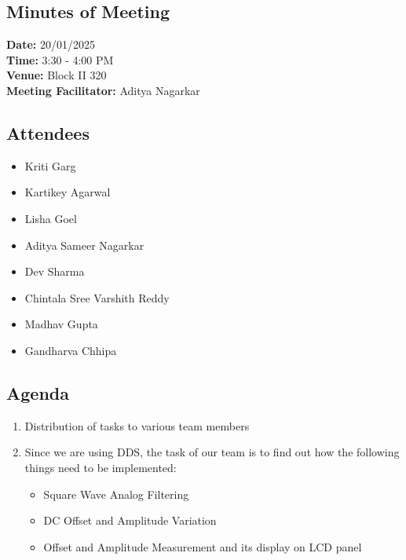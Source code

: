 \documentclass[12pt,a4paper]{article}
\begin{document}
\subsection*{Minutes of Meeting}


\noindent
\textbf{Date:} 20/01/2025 \\
\textbf{Time:} 3:30 - 4:00 PM \\
\textbf{Venue:} Block II 320 \\
\textbf{Meeting Facilitator:} Aditya Nagarkar \\
\vspace{0.3cm}


\subsection*{Attendees}
\begin{itemize}
    \item Kriti Garg
    \item Kartikey Agarwal
    \item Lisha Goel
    \item Aditya Sameer Nagarkar
    \item Dev Sharma
    \item Chintala Sree Varshith Reddy
    \item Madhav Gupta
    \item Gandharva Chhipa
\end{itemize}


\subsection*{Agenda}
\begin{enumerate}
    \item Distribution of tasks to various team members
    \item Since we are using DDS, the task of our team is to find out how the following things need to be implemented:
    \begin{itemize}
        \item Square Wave Analog Filtering
        \item DC Offset and Amplitude Variation
        \item Offset and Amplitude Measurement and its display on LCD panel
    \end{itemize}
\end{enumerate}
\end{document}
